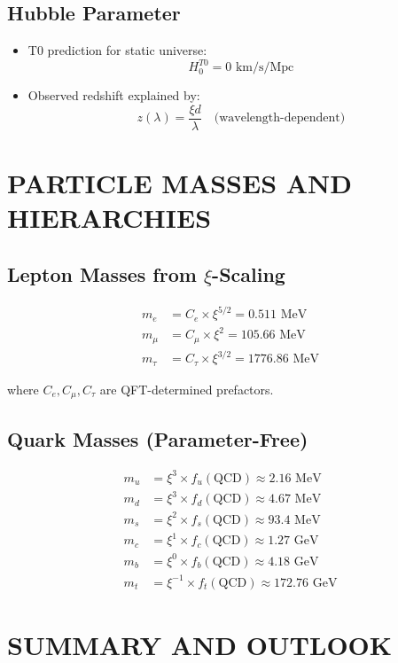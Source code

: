 \documentclass[12pt,a4paper]{article}
\begin{document}
	\subsection{Hubble Parameter}
	\begin{itemize}
		\item T0 prediction for static universe:
		$$H_0^{T0} = 0 \text{ km/s/Mpc}$$
		
		\item Observed redshift explained by:
		$$z(\lambda) = \frac{\xi d}{\lambda} \quad \text{(wavelength-dependent)}$$
	\end{itemize}
	
	\section{PARTICLE MASSES AND HIERARCHIES}
	
	\subsection{Lepton Masses from $\xi$-Scaling}
	\begin{align}
		m_e &= C_e \times \xi^{5/2} = 0.511 \text{ MeV}\\
		m_\mu &= C_\mu \times \xi^{2} = 105.66 \text{ MeV}\\
		m_\tau &= C_\tau \times \xi^{3/2} = 1776.86 \text{ MeV}
	\end{align}
	
	where $C_e, C_\mu, C_\tau$ are QFT-determined prefactors.
	
	\subsection{Quark Masses (Parameter-Free)}
	\begin{align}
		m_u &= \xi^{3} \times f_u(\text{QCD}) \approx 2.16 \text{ MeV}\\
		m_d &= \xi^{3} \times f_d(\text{QCD}) \approx 4.67 \text{ MeV}\\
		m_s &= \xi^{2} \times f_s(\text{QCD}) \approx 93.4 \text{ MeV}\\
		m_c &= \xi^{1} \times f_c(\text{QCD}) \approx 1.27 \text{ GeV}\\
		m_b &= \xi^{0} \times f_b(\text{QCD}) \approx 4.18 \text{ GeV}\\
		m_t &= \xi^{-1} \times f_t(\text{QCD}) \approx 172.76 \text{ GeV}
	\end{align}
	
	\section{SUMMARY AND OUTLOOK}
	
\end{document}
